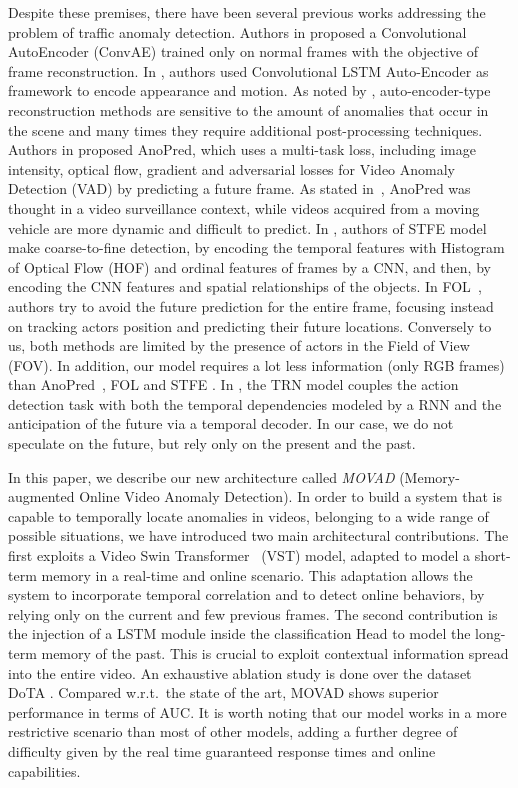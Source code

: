 Despite these premises, there have been several previous works addressing the problem of traffic anomaly detection.
Authors in \cite{hasan2016learning} proposed a Convolutional AutoEncoder (ConvAE) trained only on normal frames with the objective of frame reconstruction.
In \cite{luo2017remembering, wang2018abnormal}, authors used Convolutional LSTM Auto-Encoder as framework to encode appearance and motion.
As noted by \cite{ramachandra2020survey}, auto-encoder-type reconstruction methods are sensitive to the amount of anomalies that occur in the scene and many times they require additional post-processing techniques.
Authors in \cite{liu2018future} proposed AnoPred, which uses a multi-task loss, including image intensity, optical flow, gradient and adversarial losses for Video Anomaly Detection (VAD) by predicting a future frame.
As stated in~\cite{9712446}, AnoPred was thought in a video surveillance context, while videos acquired from a moving vehicle are more dynamic and difficult to predict.
In \cite{zhou_spatio-temporal_2022}, authors of STFE model make coarse-to-fine detection, by encoding the temporal features with Histogram of Optical Flow (HOF) \cite{wang2013action} and ordinal features of frames by a CNN, and then, by encoding the CNN features and spatial relationships of the objects.
In FOL~\cite{9712446}, authors try to avoid the future prediction for the entire frame, focusing instead on tracking actors position and predicting their future locations.
Conversely to us, both methods are limited by the presence of actors in the Field of View (FOV).
In addition, our model requires a lot less information (only RGB frames) than AnoPred~\cite{liu2018future}, FOL \cite{9712446} and STFE \cite{zhou_spatio-temporal_2022}.
In \cite{xu2019temporal}, the TRN model couples the action detection task with both the temporal dependencies modeled by a RNN and the anticipation of the future via a temporal decoder.
In our case, we do not speculate on the future, but rely only on the present and the past.

In this paper, we describe our new architecture called \emph{MOVAD} (Memory-augmented Online Video Anomaly Detection).
In order to build a system that is capable to temporally locate anomalies in videos, belonging to a wide range of possible situations, we have introduced two main architectural contributions.
The first exploits a Video Swin Transformer~\cite{liu_video_2022} (VST) model, adapted to model a short-term memory in a real-time and online scenario.
This adaptation allows the system to incorporate temporal correlation and to detect online behaviors, by relying only on the current and few previous frames.
The second contribution is the injection of a LSTM module inside the classification Head to model the long-term memory of the past.
This is crucial to exploit contextual information spread into the entire video.
An exhaustive ablation study is done over the dataset DoTA \cite{9712446}.
Compared w.r.t.~the state of the art, MOVAD shows superior performance in terms of AUC.
It is worth noting that our model works in a more restrictive scenario than most of other models, adding a further degree of difficulty given by the real time guaranteed response times and online capabilities.